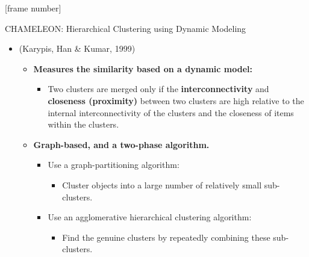 \documentclass[aspectratio=169,t,xcolor=dvipsnames]{beamer}
\begin{document}
  { %
    [frame number]
    \begin{frame}{CHAMELEON: Hierarchical Clustering using Dynamic Modeling}
      \begin{itemize}
        \item (Karypis, Han \& Kumar, 1999)
        \begin{itemize}
          \item \textbf{Measures the similarity based on a dynamic model:}
          \begin{itemize}
            \item Two clusters are merged only if the \textbf{interconnectivity} and \textbf{closeness (proximity)} between two clusters are high relative to the internal interconnectivity of the clusters and the closeness of items within the clusters.
          \end{itemize}
          \item \textbf{Graph-based, and a two-phase algorithm.}
          \begin{itemize}
            \item Use a graph-partitioning algorithm:
            \begin{itemize}
              \item Cluster objects into a large number of relatively small sub-clusters.
            \end{itemize}
            \item Use an agglomerative hierarchical clustering algorithm:
            \begin{itemize}
              \item Find the genuine clusters by repeatedly combining these sub-clusters.
            \end{itemize}
          \end{itemize}
        \end{itemize}
      \end{itemize}
    \end{frame}
  }
\end{document}
